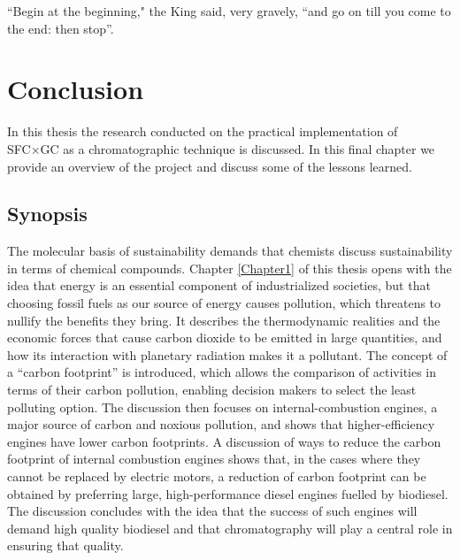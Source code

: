 
\begin{savequote}[\quotewidth]
``Begin at the beginning," the King said, very gravely, ``and go on till you come to the end: then stop''.
\end{savequote}

\chapter{Conclusion} %
\label{Chapter9}


In this thesis the research conducted on the practical implementation of SFC×GC
as a chromatographic technique is discussed. In this final chapter we provide an
overview of the project and discuss some of the lessons learned.

\section{Synopsis}

The molecular basis of sustainability \autocite{Anastas2016} demands that
chemists discuss sustainability in terms of chemical compounds. Chapter
\ref{Chapter1} of this thesis opens with the idea that energy is an essential
component of industrialized societies, but that choosing fossil fuels as our
source of energy causes pollution, which threatens to nullify the benefits they
bring. It describes the thermodynamic realities and the economic forces that
cause carbon dioxide to be emitted in large quantities, and how its interaction
with planetary radiation makes it a pollutant. The concept of a ``carbon
footprint'' is introduced, which allows the comparison of activities in terms of
their carbon pollution, enabling decision makers to select the least polluting
option. The discussion then focuses on internal-combustion engines, a major
source of carbon and noxious pollution, and shows that higher-efficiency engines
have lower carbon footprints. A discussion of ways to reduce the carbon
footprint of internal combustion engines shows that, in the cases where they
cannot be replaced by electric motors, a reduction of carbon footprint can be
obtained by preferring large, high-performance diesel engines fuelled by
biodiesel. The discussion concludes with the idea that the success of such
engines will demand high quality biodiesel and that chromatography will play a
central role in ensuring that quality.

